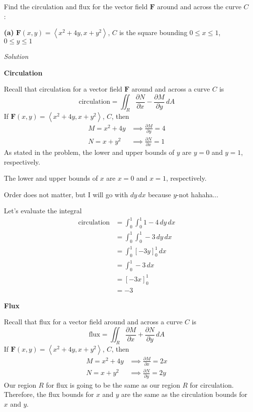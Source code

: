 \documentclass{article}
\newcommand{\lra}[1]{\left\langle #1 \right\rangle}
\newcommand{\lrb}[1]{\left[ #1 \right]}
\newcommand{\F}[0]{\mathbf{F}}
\newcommand{\Solution}{\textit{Solution}}
\begin{document}
Find the circulation and flux for the vector field $\F$ around and across the curve $C$:

{}\textbf{(a)} $\F(x,y)=\lra{x^2+4y,x+y^2}$, $C$ is the square bounding $0\leq x\leq 1$, $0\leq y\leq 1$

\Solution

{}\textbf{Circulation}

Recall that circulation for a vector field $\F$ around and across a curve $C$ is
\begin{equation*}
    \text{circulation}= \iint_R \frac{\partial N}{\partial x} - \frac{\partial M}{\partial y}\,dA
\end{equation*}
If $\F(x,y)=\lra{x^2+4y,x+y^2}$, $C$, then
\begin{align*}
    M=x^2+4y &\implies \frac{\partial M}{\partial y}=4\\
    N=x+y^2&\implies \frac{\partial N}{\partial x}=1
\end{align*}
As stated in the problem, the lower and upper bounds of $y$ are $y=0$ and $y=1$, respectively. 

The lower and upper bounds of $x$ are $x=0$ and $x=1$, respectively. 

Order does not matter, but I will go with $dy\,dx$ because $y$-not hahaha...

Let's evaluate the integral
\begin{align*}
    \text{circulation}&=\int_0^1\int_0^1 1 - 4\,dy\,dx\\
    &=\int_0^1 \int_0^1 -3\,dy\,dx\\
    &=\int_0^1 \lrb{-3y}_0^1\,dx\\
    &=\int_0^1 -3\,dx\\
    &=\lrb{-3x}_0^1\\
    &=-3
\end{align*}
\newpage
{}
{}\textbf{Flux}

Recall that flux for a vector field around and across a curve $C$ is
\begin{equation*}
   \text{flux} = \iint_R \frac{\partial M}{\partial x} + \frac{\partial N}{\partial y}\,dA
\end{equation*}
If $\F(x,y)=\lra{x^2+4y,x+y^2}$, $C$, then
\begin{align*}
    M=x^2+4y &\implies \frac{\partial M}{\partial x}=2x\\
    N=x+y^2&\implies \frac{\partial N}{\partial y}=2y
\end{align*}
Our region $R$ for flux is going to be the same as our region $R$ for circulation. Therefore, the flux bounds for $x$ and $y$ are the same as the circulation bounds for $x$ and $y$.
\end{document}
